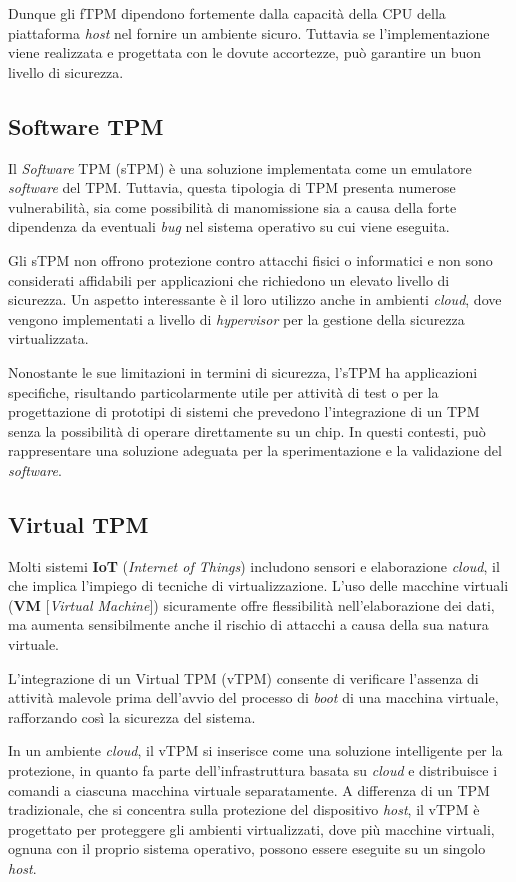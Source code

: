 Dunque gli fTPM dipendono fortemente dalla capacità della CPU della piattaforma \textit{host} nel fornire un ambiente sicuro. Tuttavia se l’implementazione viene realizzata e progettata con le dovute accortezze, può garantire un buon livello di sicurezza.

\subsection{Software TPM}
Il \textit{Software} TPM (sTPM) è una soluzione implementata come un emulatore \textit{software} del TPM. Tuttavia, questa tipologia di TPM presenta numerose vulnerabilità, sia come possibilità di manomissione sia a causa della forte dipendenza da eventuali \textit{bug} nel sistema operativo su cui viene eseguita.

Gli sTPM non offrono protezione contro attacchi fisici o informatici e non sono considerati affidabili per applicazioni che richiedono un elevato livello di sicurezza. Un aspetto interessante è il loro utilizzo anche in ambienti \textit{cloud}, dove vengono implementati a livello di \textit{hypervisor} per la gestione della sicurezza virtualizzata.

Nonostante le sue limitazioni in termini di sicurezza, l’sTPM ha applicazioni specifiche, risultando particolarmente utile per attività di test o per la progettazione di prototipi di sistemi che prevedono l’integrazione di un TPM senza la possibilità di operare direttamente su un chip. In questi contesti, può rappresentare una soluzione adeguata per la sperimentazione e la validazione del \textit{software}.

\subsection{Virtual TPM}
Molti sistemi \textbf{IoT} (\textit{Internet of Things}) includono sensori e elaborazione \textit{cloud}, il che implica l’impiego di tecniche di virtualizzazione. L'uso delle macchine virtuali (\textbf{VM} [\textit{Virtual Machine}]) sicuramente offre flessibilità nell'elaborazione dei dati, ma aumenta sensibilmente anche il rischio di attacchi a causa della sua natura virtuale.

L'integrazione di un Virtual TPM (vTPM) consente di verificare l'assenza di attività malevole prima dell'avvio del processo di \textit{boot} di una macchina virtuale, rafforzando così la sicurezza del sistema. 

In un ambiente \textit{cloud}, il vTPM si inserisce come una soluzione intelligente per la protezione, in quanto fa parte dell'infrastruttura basata su \textit{cloud} e distribuisce i comandi a ciascuna macchina virtuale separatamente. A differenza di un TPM tradizionale, che si concentra sulla protezione del dispositivo \textit{host}, il vTPM è progettato per proteggere gli ambienti virtualizzati, dove più macchine virtuali, ognuna con il proprio sistema operativo, possono essere eseguite su un singolo \textit{host}. 

